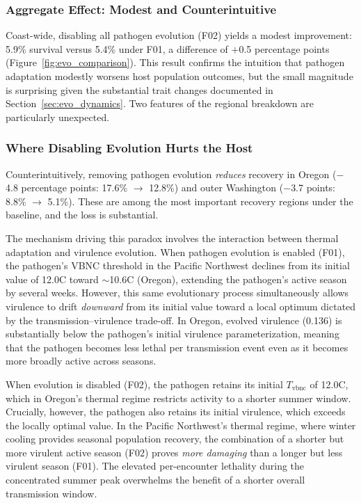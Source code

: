 \subsubsection{Aggregate Effect: Modest and Counterintuitive}

Coast-wide, disabling all pathogen evolution (F02) yields a modest
improvement: 5.9\% survival versus 5.4\% under F01, a difference of
$+$0.5 percentage points (Figure~\ref{fig:evo_comparison}).  This
result confirms the intuition that pathogen adaptation modestly
worsens host population outcomes, but the small magnitude is
surprising given the substantial trait changes documented in
Section~\ref{sec:evo_dynamics}.  Two features of the regional
breakdown are particularly unexpected.

\subsubsection{Where Disabling Evolution Hurts the Host}

Counterintuitively, removing pathogen evolution \textit{reduces}
recovery in Oregon ($-$4.8 percentage points: 17.6\% $\rightarrow$
12.8\%) and outer Washington ($-$3.7 points: 8.8\% $\rightarrow$
5.1\%).  These are among the most important recovery regions under the
baseline, and the loss is substantial.

The mechanism driving this paradox involves the interaction between
thermal adaptation and virulence evolution.  When pathogen evolution is
enabled (F01), the pathogen's VBNC threshold in the Pacific Northwest
declines from its initial value of 12.0\textdegree C toward
$\sim$10.6\textdegree C (Oregon), extending the pathogen's active
season by several weeks.  However, this same evolutionary process
simultaneously allows virulence to drift \textit{downward} from its
initial value toward a local optimum dictated by the
transmission--virulence trade-off.  In Oregon, evolved virulence
(0.136) is substantially below the pathogen's initial virulence
parameterization, meaning that the pathogen becomes less lethal per
transmission event even as it becomes more broadly active across
seasons.

When evolution is disabled (F02), the pathogen retains its initial
$T_\mathrm{vbnc}$ of 12.0\textdegree C, which in Oregon's thermal
regime restricts activity to a shorter summer window.  Crucially,
however, the pathogen also retains its initial virulence, which exceeds
the locally optimal value.  In the Pacific Northwest's thermal regime,
where winter cooling provides seasonal population recovery, the
combination of a shorter but more virulent active season (F02) proves
\textit{more damaging} than a longer but less virulent season (F01).
The elevated per-encounter lethality during the concentrated summer
peak overwhelms the benefit of a shorter overall transmission window.

